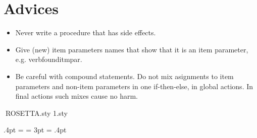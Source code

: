 \section{Advices}
\begin{itemize}
\item Never write a procedure that has side effects.
\item Give (new) item parameters names that show that it is an
      item parameter, e.g. verbfounditmpar.
\item Be careful with compound statements. Do not mix asignments to
      item parameters and non-item parameters in one if-then-else,
      in global actions. In final actions such mixes cause no harm.
\end{itemize}


ROSETTA.sty
\def\@ptsize{1}
\@namedef{ds@10pt}{\def\@ptsize{0}}
\@namedef{ds@12pt}{\def\@ptsize{2}}
\@twosidetrue
\@mparswitchtrue
\def\ds@draft{\overfullrule 5pt}
\@options
\@ptsize.sty\relax


\def\labelenumi{\arabic{enumi}.}
\def\theenumi{\arabic{enumi}}
\def\labelenumii{(\alph{enumii})}
\def\theenumii{\alph{enumii}}
\def\p@enumii{\theenumi}
\def\labelenumiii{\roman{enumiii}.}
\def\theenumiii{\roman{enumiii}}
\def\p@enumiii{\theenumi(\theenumii)}
\def\labelenumiv{\Alph{enumiv}.}
\def\theenumiv{\Alph{enumiv}}
\def\p@enumiv{\p@enumiii\theenumiii}
\def\labelitemi{$\bullet$}
\def\labelitemii{\bf --}
\def\labelitemiii{$\ast$}
\def\labelitemiv{$\cdot$}
\def\verse{
   \let\\=\@centercr
   \list{}{\itemsep\z@ \itemindent -1.5em\listparindent \itemindent
      \rightmargin\leftmargin\advance\leftmargin 1.5em}
   \item[]}
\let\endverse\endlist
\def\quotation{
   \list{}{\listparindent 1.5em
      \itemindent\listparindent
      \rightmargin\leftmargin \parsep 0pt plus 1pt}\item[]}
\let\endquotation=\endlist
\def\quote{
   \list{}{\rightmargin\leftmargin}\item[]}
\let\endquote=\endlist
\def\descriptionlabel#1{\hspace\labelsep \bf #1}
\def\description{
   \list{}{\labelwidth\z@ \itemindent-\leftmargin
      \let\makelabel\descriptionlabel}}
\let\enddescription\endlist


\def\@begintheorem#1#2{\it \trivlist \item[\hskip \labelsep{\bf #1\ #2}]}
\def\@endtheorem{\endtrivlist}
\def\theequation{\arabic{equation}}
\def\titlepage{
   \@restonecolfalse
   \if@twocolumn\@restonecoltrue\onecolumn
   \else \newpage
   \fi
   \thispagestyle{empty}\c@page\z@}
\def\endtitlepage{\if@restonecol\twocolumn \else \newpage \fi}
\arraycolsep 5pt \tabcolsep 6pt \arrayrulewidth .4pt \doublerulesep 2pt
\tabbingsep {}
\skip\@mpfootins = \skip\footins
\fboxsep = 3pt \fboxrule = .4pt


